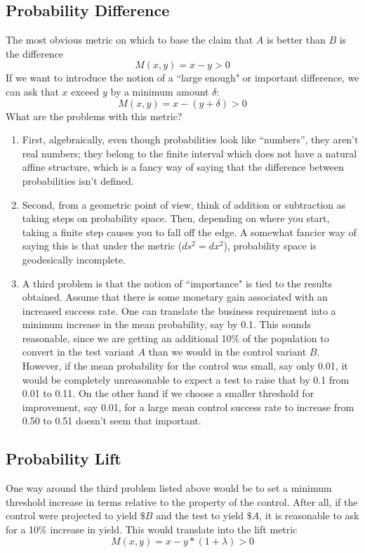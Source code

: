 \documentclass[12pt]{report}
\newcommand{\be}{\begin{enumerate}} %
\newcommand{\ee}{\end{enumerate}} %
\newcommand{\bdm}{\begin{displaymath}} %
\newcommand{\edm}{\end{displaymath}} %
\begin{document}
\subsection{Probability Difference}\label{sec:pdiff}
The most obvious metric on which to base the claim that \(A\) is
better than \(B\) is the difference \bdm M(x,y) = x-y >0 \edm If we
want to introduce the notion of a ``large enough" or important
difference, we can ask that \(x\) exceed \(y\) by a minimum amount
\(\delta\): \bdm M(x,y) = x-(y+\delta) >0 \edm What are the problems
with this metric?
\be
\item First, algebraically, even though probabilities
look like ``numbers'', they aren't real numbers; they belong to the
finite interval which does not have a natural affine structure, which
is a fancy way of saying that the difference between probabilities
isn't defined.
\item Second, from a geometric point of view, think of addition or
subtraction as taking steps on probability space. Then, depending on where you start, taking a finite
step causes you to fall off the edge. A somewhat fancier way of saying this is that under the metric
(\(ds^2 = dx^2\)),
probability space is geodesically incomplete. 
\item A third problem is that the notion of ``importance" is tied to the
results obtained. Assume that there is some monetary gain associated
with an increased success rate. One can translate the business
requirement into a minimum increase in the mean probability,
say by 0.1. This sounds
reasonable, since we are getting an additional 10\% of the population
to convert in the test variant \(A\) than we would in the control
variant \(B\). However, if the mean probability
for the control was small, say only 0.01, it would be completely
unreasonable to expect a test to raise that by 0.1 from 0.01 to 0.11. On the
other hand if we choose a smaller threshold for improvement, say 0.01,
for a large mean control success rate to increase from 0.50 to 0.51 doesn't
seem that important.
\ee

\subsection{Probability Lift}\label{sec:plift}
One way around the third problem listed above
would be to set a minimum threshold increase in terms
relative to the property of the control. After all, if the control were
projected to yield \(\$B\)
and the test to yield \(\$A\), it is reasonable to ask for a 10\%
increase in yield. This would translate into the lift metric
\bdm
M(x,y) = x-y*(1+\lambda) >0
\edm
\end{document}
